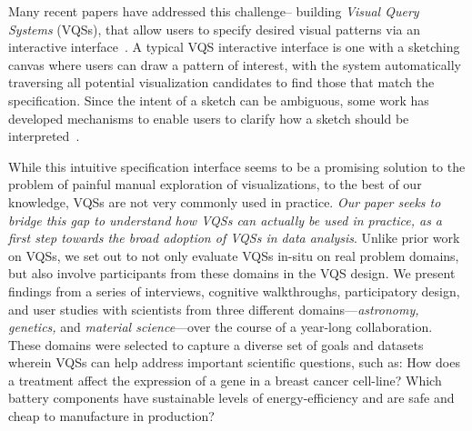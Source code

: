 \par Many recent papers have addressed this challenge-- building {\em Visual Query Systems} (VQSs), 
that allow users to specify 
desired visual patterns 
via an interactive interface~\cite{mohebbi2011google,Hochheiser2004,wattenberg2001sketching,Siddiqui2017VLDB,ryall2005querylines,correll2016semantics,Mannino2018,Eichmann2015,Holz2009}. 
A typical VQS interactive interface is one with 
a sketching canvas
where users can draw a pattern of interest,
with the system automatically traversing 
all potential visualization candidates 
to find those that match the specification. 
Since the intent of a sketch can be ambiguous, 
some work has developed mechanisms to
enable users to clarify 
how a sketch should be interpreted~\cite{ryall2005querylines,correll2016semantics,Mannino2018,Eichmann2015,Holz2009}. 

\par 
While this intuitive 
specification interface 
seems to be a promising solution 
to the problem of painful manual exploration of visualizations, 
to the best of our knowledge, VQSs are not very commonly used in practice. 
{\em Our paper seeks to bridge this gap 
to understand how VQSs can actually be used in practice, 
as a first step towards the broad adoption of VQSs in data analysis}.
Unlike prior work on VQSs,
we set out to not only evaluate VQSs in-situ on
real problem domains, but also involve participants
from these domains in the VQS design. 
We present findings from a series of interviews, 
cognitive walkthroughs, participatory design, 
and user studies with scientists from three different domains---{\em astronomy, genetics,} and {\em material science}---over the course of 
a year-long collaboration. 
These domains were selected to capture 
a diverse set of goals 
and datasets wherein VQSs can help address 
important scientific questions, such as: 
How does a treatment affect the expression 
of a gene in a breast cancer cell-line? 
Which battery components have sustainable 
levels of energy-efficiency and are safe and 
cheap to manufacture in production?

